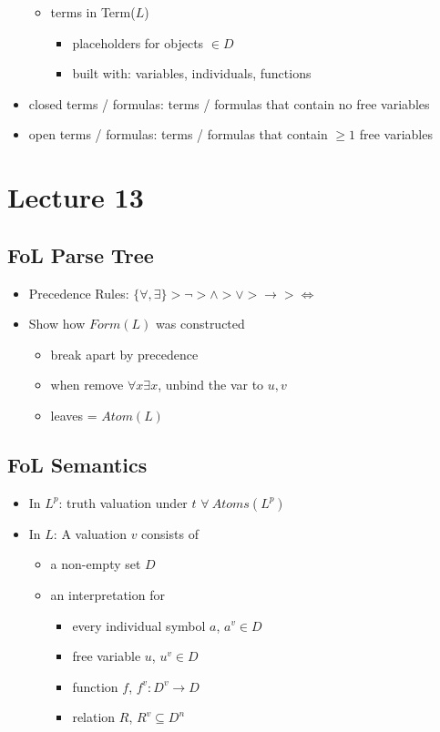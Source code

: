 \documentclass[11pt]{article}
\begin{document}
\begin{itemize}
\begin{itemize}
\begin{itemize}
        \end{itemize}
        \item terms in Term($L$)
        \begin{itemize}
            \item placeholders for objects $\in D$
            \item built with: variables, individuals, functions 
        \end{itemize}
    \end{itemize}
    \item closed terms / formulas: terms / formulas that contain no free variables
    \item open terms / formulas: terms / formulas that contain $\geq 1$ free variables 
\end{itemize}

\section{Lecture 13}
\subsection{FoL Parse Tree}
\begin{itemize}
    \item Precedence Rules: $\{\forall,\exists\}>\neg>\land>\lor>\rightarrow>\iff$
    \item Show how $Form(L)$ was constructed 
    \begin{itemize}
        \item break apart by precedence 
        \item when remove $\forall x \exists x$, unbind the var to $u,v$
        \item leaves = $Atom(L)$
    \end{itemize}
\end{itemize}
\subsection{FoL Semantics}
\begin{itemize}
    \item In $L^p$: truth valuation under $t$ $\forall\ Atoms(L^p)$
    \item In $L$: A valuation $v$ consists of 
    \begin{itemize}
        \item a non-empty set $D$
        \item an interpretation for 
        \begin{itemize}
            \item every individual symbol $a$, $a^v\in D$
            \item free variable $u$, $u^v\in D$
            \item function $f$, $f^v:D^v\rightarrow D$
            \item relation $R$, $R^v\subseteq D^n$
        \end{itemize}
    \end{itemize}
\end{itemize}
\end{document}

